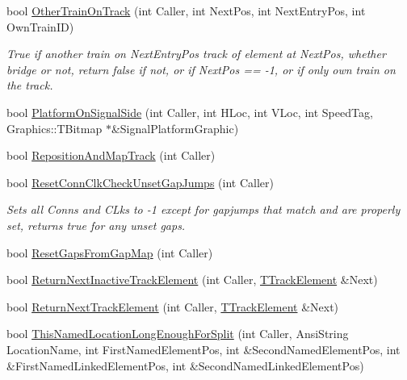 \begin{DoxyCompactItemize}
\item 
\mbox{\label{class_t_track_aeac90568597c9f13a27fa90c58f9041f}} 
bool \mbox{\hyperlink{class_t_track_aeac90568597c9f13a27fa90c58f9041f}{Other\+Train\+On\+Track}} (int Caller, int Next\+Pos, int Next\+Entry\+Pos, int Own\+Train\+ID)
\begin{DoxyCompactList}\small\item\em True if another train on Next\+Entry\+Pos track of element at Next\+Pos, whether bridge or not, return false if not, or if Next\+Pos == -\/1, or if only own train on the track. \end{DoxyCompactList}\item 
bool \mbox{\hyperlink{class_t_track_a7c2888cb7acea2b9c65c5f9cc538df66}{Platform\+On\+Signal\+Side}} (int Caller, int H\+Loc, int V\+Loc, int Speed\+Tag, Graphics\+::\+T\+Bitmap $\ast$\&Signal\+Platform\+Graphic)
\item 
bool \mbox{\hyperlink{class_t_track_a5e2e215fae5247206220d301c324e9a0}{Reposition\+And\+Map\+Track}} (int Caller)
\item 
\mbox{\label{class_t_track_ac505e8a8f4097b2fc62e16e3a5a2e28b}} 
bool \mbox{\hyperlink{class_t_track_ac505e8a8f4097b2fc62e16e3a5a2e28b}{Reset\+Conn\+Clk\+Check\+Unset\+Gap\+Jumps}} (int Caller)
\begin{DoxyCompactList}\small\item\em Sets all Conns and C\+Lks to -\/1 except for gapjumps that match and are properly set, returns true for any unset gaps. \end{DoxyCompactList}\item 
bool \mbox{\hyperlink{class_t_track_a1be0a43c6b1dc736d981fe7d883d7f01}{Reset\+Gaps\+From\+Gap\+Map}} (int Caller)
\item 
bool \mbox{\hyperlink{class_t_track_a58a2afacadd0f564b474ac0faabc88d4}{Return\+Next\+Inactive\+Track\+Element}} (int Caller, \mbox{\hyperlink{class_t_track_element}{T\+Track\+Element}} \&Next)
\item 
bool \mbox{\hyperlink{class_t_track_a90e1db27659603b72a703c017ee576c8}{Return\+Next\+Track\+Element}} (int Caller, \mbox{\hyperlink{class_t_track_element}{T\+Track\+Element}} \&Next)
\item 
\mbox{\label{class_t_track_a4dffe604a7d6b14cce2c94ad7522fb7f}} 
bool \mbox{\hyperlink{class_t_track_a4dffe604a7d6b14cce2c94ad7522fb7f}{This\+Named\+Location\+Long\+Enough\+For\+Split}} (int Caller, Ansi\+String Location\+Name, int First\+Named\+Element\+Pos, int \&Second\+Named\+Element\+Pos, int \&First\+Named\+Linked\+Element\+Pos, int \&Second\+Named\+Linked\+Element\+Pos)

\end{DoxyCompactItemize}
